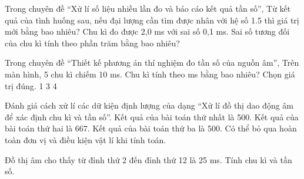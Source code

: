 \begin{ex}
Trong chuyên đề “Xử lí số liệu nhiều lần đo và báo cáo kết quả tần số”, Từ kết quả của tình huống sau, nếu đại lượng cần tìm được nhân với hệ số 1.5 thì giá trị mới bằng bao nhiêu? Chu kì đo được 2,0 ms với sai số 0,1 ms. Sai số tương đối của chu kì tính theo phần trăm bằng bao nhiêu?
\end{ex}

\begin{ex}
Trong chuyên đề “Thiết kế phương án thí nghiệm đo tần số của nguồn âm”, Trên màn hình, 5 chu kì chiếm 10 ms. Chu kì tính theo ms bằng bao nhiêu? Chọn giá trị đúng.
\choice
{1}
{3}
{}
{4}
\end{ex}

\begin{ex}
Đánh giá cách xử lí các dữ kiện định lượng của dạng “Xử lí đồ thị dao động âm để xác định chu kì và tần số”.
\choiceTF
{\True Kết quả của bài toán thứ nhất là 500.}
{\True Kết quả của bài toán thứ hai là 667.}
{\True Kết quả của bài toán thứ ba là 500.}
{Có thể bỏ qua hoàn toàn đơn vị và điều kiện vật lí khi tính toán.}
\end{ex}

\begin{ex}
Đồ thị âm cho thấy từ đỉnh thứ 2 đến đỉnh thứ 12 là 25 ms. Tính chu kì và tần số.
\choiceTF

\end{ex}

